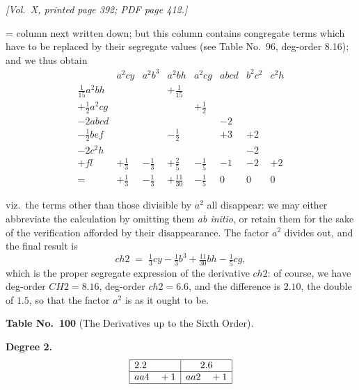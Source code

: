 \documentclass[11pt]{article}
\begin{document}
\noindent\textit{[Vol.~X, printed page 392; PDF page 412.]}

= column next written down; but this column contains congregate terms which have to be replaced by their segregate values (see Table No.~96, deg-order 8.16); and we thus obtain
\[
\begin{array}{l|ccccccc}
& a^{2}cy & a^{2}b^{3} & a^{2}bh & a^{2}cg & abcd & b^{2}c^{2} & c^{2}h \\\hline
\tfrac{1}{15}a^{2}bh & & & +\tfrac{1}{15} & & & & \\
+\tfrac{1}{2}a^{2}cg & & & & +\tfrac{1}{2} & & & \\
-2abcd & & & & & -2 & & \\
-\tfrac{1}{2}bef & & & -\tfrac{1}{2} & & +3 & +2 & \\
-2c^{2}h & & & & & & -2 & \\
+fl & +\tfrac{1}{3} & -\tfrac{1}{3} & +\tfrac{2}{5} & -\tfrac{1}{5} & -1 & -2 & +2 \\\hline
=& +\tfrac{1}{3} & -\tfrac{1}{3} & +\tfrac{11}{30} & -\tfrac{1}{5} & 0 & 0 & 0
\end{array}
\]

\noindent viz.\ the terms other than those divisible by $a^{2}$ all disappear: we may either abbreviate the calculation by omitting them \emph{ab initio}, or retain them for the sake of the verification afforded by their disappearance. The factor $a^{2}$ divides out, and the final result is
\[
ch2 \;=\; \tfrac{1}{3}cy - \tfrac{1}{3}b^{3} + \tfrac{11}{30}bh - \tfrac{1}{5}cg,
\]
which is the proper segregate expression of the derivative $ch2$: of course, we have deg-order $CH2 = 8.16$, deg-order $ch2 = 6.6$, and the difference is $2.10$, the double of $1.5$, so that the factor $a^{2}$ is as it ought to be.

\bigskip

\begin{center}
\textbf{Table No.~100} (The Derivatives up to the Sixth Order).
\end{center}

\medskip

\noindent\textbf{Degree 2.}
\[
\begin{array}{|l|c|}\hline
2.2 & 2.6 \\\hline
aa4 \quad +1 & aa2 \quad +1 \\\hline
\end{array}
\]
\end{document}

